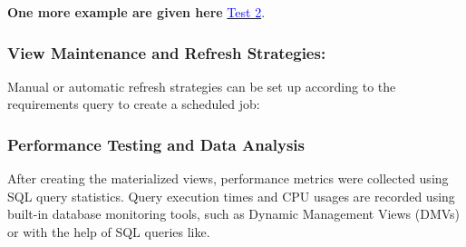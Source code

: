 \textbf{One more example are given here } \hyperref[test:Test2]{\textcolor{blue}{Test 2}}. \vspace{.4cm}

\subsubsection{View Maintenance and Refresh Strategies:}\label{View_maintainance} Manual or automatic refresh strategies can be set up according to the requirements query to create a scheduled job: \vspace{.4cm}



\subsubsection{Performance Testing and Data Analysis} After creating the materialized views, performance metrics were collected using SQL query statistics. Query execution times and CPU usages are recorded using built-in database monitoring tools, such as Dynamic Management Views (DMVs) or with the help of SQL queries like. 

 

